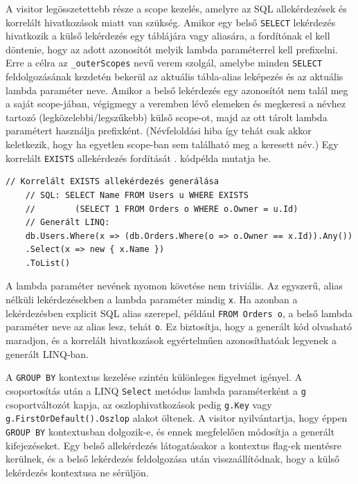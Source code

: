 A visitor legösszetettebb része a scope kezelés, amelyre az SQL allekérdezések és korrelált hivatkozások miatt van szükség. Amikor egy belső \texttt{SELECT} lekérdezés hivatkozik a külső lekérdezés egy táblájára vagy aliasára, a fordítónak el kell döntenie, hogy az adott azonosítót melyik lambda paraméterrel kell prefixelni. Erre a célra az \texttt{\_outerScopes} nevű verem szolgál, amelybe minden \texttt{SELECT} feldolgozásának kezdetén bekerül az aktuális tábla-alias leképezés és az aktuális lambda paraméter neve. Amikor a belső lekérdezés egy azonosítót nem talál meg a saját scope-jában, végigmegy a veremben lévő elemeken és megkeresi a névhez tartozó (legközelebbi/legszűkebb) külső scope-ot, majd az ott tárolt lambda paramétert használja prefixként. (Névfeloldási hiba így tehát csak akkor keletkezik, hogy ha egyetlen scope-ban sem található meg a keresett név.) Egy korrelált \texttt{EXISTS} allekérdezés fordítását . kódpélda mutatja be.

\begin{lstlisting}[caption={Korrelált allekérdezés scope kezelése}, label={lst:korrelalt}]
	// Korrelált EXISTS allekérdezés generálása
	// SQL: SELECT Name FROM Users u WHERE EXISTS 
	//        (SELECT 1 FROM Orders o WHERE o.Owner = u.Id)
	// Generált LINQ:
	db.Users.Where(x => (db.Orders.Where(o => o.Owner == x.Id)).Any())
	.Select(x => new { x.Name })
	.ToList()
\end{lstlisting}

A lambda paraméter nevének nyomon követése nem triviális. Az egyszerű, alias nélküli lekérdezésekben a lambda paraméter mindig \texttt{x}. Ha azonban a lekérdezésben explicit SQL alias szerepel, például \texttt{FROM Orders o}, a belső lambda paraméter neve az alias lesz, tehát \texttt{o}. Ez biztosítja, hogy a generált kód olvasható maradjon, és a korrelált hivatkozások egyértelműen azonosíthatóak legyenek a generált LINQ-ban.

A \texttt{GROUP BY} kontextus kezelése szintén különleges figyelmet igényel. A csoportosítás után a LINQ \texttt{Select} metódus lambda paraméterként a \texttt{g} csoportváltozót kapja, az oszlophivatkozások pedig \texttt{g.Key} vagy \\\texttt{g.First\-OrDefault().Oszlop} alakot öltenek. A visitor nyilvántartja, hogy éppen \\ \texttt{GROUP BY} kontextusban dolgozik-e, és ennek megfelelően módosítja a generált kifejezéseket. Egy belső allekérdezés látogatásakor a kontextus flag-ek mentésre kerülnek, és a belső lekérdezés feldolgozása után visszaállítódnak, hogy a külső lekérdezés kontextusa ne sérüljön.

